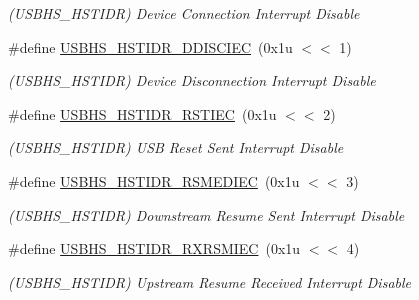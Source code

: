 \begin{DoxyCompactItemize}
\begin{DoxyCompactList}\small\item\em (U\+S\+B\+H\+S\+\_\+\+H\+S\+T\+I\+DR) Device Connection Interrupt Disable \end{DoxyCompactList}\item 
\mbox{\label{group__SAME70__USBHS_gae7c9ec90aa2f4d31dcf59aa75706904b}} 
\#define \mbox{\hyperlink{group__SAME70__USBHS_gae7c9ec90aa2f4d31dcf59aa75706904b}{U\+S\+B\+H\+S\+\_\+\+H\+S\+T\+I\+D\+R\+\_\+\+D\+D\+I\+S\+C\+I\+EC}}~(0x1u $<$$<$ 1)
\begin{DoxyCompactList}\small\item\em (U\+S\+B\+H\+S\+\_\+\+H\+S\+T\+I\+DR) Device Disconnection Interrupt Disable \end{DoxyCompactList}\item 
\mbox{\label{group__SAME70__USBHS_ga08e59c5e9f7b06336c5891b816818d20}} 
\#define \mbox{\hyperlink{group__SAME70__USBHS_ga08e59c5e9f7b06336c5891b816818d20}{U\+S\+B\+H\+S\+\_\+\+H\+S\+T\+I\+D\+R\+\_\+\+R\+S\+T\+I\+EC}}~(0x1u $<$$<$ 2)
\begin{DoxyCompactList}\small\item\em (U\+S\+B\+H\+S\+\_\+\+H\+S\+T\+I\+DR) U\+SB Reset Sent Interrupt Disable \end{DoxyCompactList}\item 
\mbox{\label{group__SAME70__USBHS_ga7c699747f489cbb80ea42c95a9d6a8d0}} 
\#define \mbox{\hyperlink{group__SAME70__USBHS_ga7c699747f489cbb80ea42c95a9d6a8d0}{U\+S\+B\+H\+S\+\_\+\+H\+S\+T\+I\+D\+R\+\_\+\+R\+S\+M\+E\+D\+I\+EC}}~(0x1u $<$$<$ 3)
\begin{DoxyCompactList}\small\item\em (U\+S\+B\+H\+S\+\_\+\+H\+S\+T\+I\+DR) Downstream Resume Sent Interrupt Disable \end{DoxyCompactList}\item 
\mbox{\label{group__SAME70__USBHS_gae0e07a0dbd66d3c04b103b99476029d1}} 
\#define \mbox{\hyperlink{group__SAME70__USBHS_gae0e07a0dbd66d3c04b103b99476029d1}{U\+S\+B\+H\+S\+\_\+\+H\+S\+T\+I\+D\+R\+\_\+\+R\+X\+R\+S\+M\+I\+EC}}~(0x1u $<$$<$ 4)
\begin{DoxyCompactList}\small\item\em (U\+S\+B\+H\+S\+\_\+\+H\+S\+T\+I\+DR) Upstream Resume Received Interrupt Disable \end{DoxyCompactList}\item 

\end{DoxyCompactItemize}
